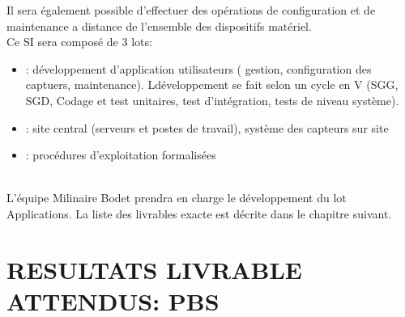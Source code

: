 \documentclass[]{scrartcl}
\begin{document}
Il sera également possible d'effectuer des opérations de configuration et de maintenance a distance de l'ensemble des dispositifs matériel.\\

Ce SI sera composé de 3 lots:
\begin{itemize}
\item {}: développement d'application utilisateurs ( gestion, configuration des captuers, maintenance). Ldéveloppement se fait selon un cycle en V (SGG, SGD, Codage et test unitaires, test d'intégration, tests de niveau système). 
\item {}: site central (serveurs et postes de travail), système des capteurs sur site
\item {}: procédures d'exploitation formalisées
\end{itemize}
\ \\
L'équipe Milinaire Bodet prendra en charge le développement du lot Applications. La liste des livrables exacte est décrite dans le chapitre suivant. 
\newpage
\section{RESULTATS LIVRABLE ATTENDUS: PBS}
\end{document}
